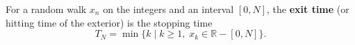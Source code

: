 For a random walk $x_n$ on the integers and an interval $[0,N]$, the \textbf{exit time} (or hitting time of the exterior) is the stopping time
$$T_N = \min \{ k \mid k \geq 1, \; x_k \in \mathbb{R} - [0,N] \}.$$
